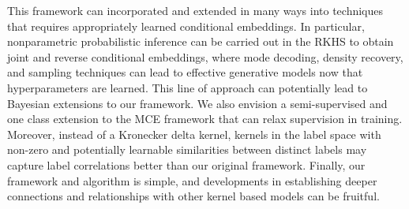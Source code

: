 \documentclass[twoside]{article}
\begin{document}
		This framework can incorporated and extended in many ways into techniques that requires appropriately learned conditional embeddings. In particular, nonparametric probabilistic inference can be carried out in the \gls{RKHS} to obtain joint and reverse conditional embeddings, where mode decoding, density recovery, and sampling techniques can lead to effective generative models now that hyperparameters are learned. This line of approach can potentially lead to Bayesian extensions to our framework. We also envision a semi-supervised and one class extension to the \gls{MCE} framework that can relax supervision in training. Moreover, instead of a Kronecker delta kernel, kernels in the label space with non-zero and potentially learnable similarities between distinct labels may capture label correlations better than our original framework. Finally, our framework and algorithm is simple, and developments in establishing deeper connections and relationships with other kernel based models can be fruitful. 
	
	\newpage
	
	
\end{document}
